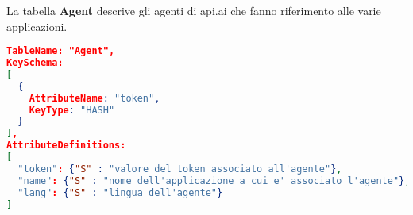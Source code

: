 La tabella \textbf{Agent} descrive gli agenti di api.ai che fanno riferimento alle varie applicazioni.
\begin{lstlisting}[language=json,firstnumber=1]
TableName: "Agent",
KeySchema:
[
  {
    AttributeName: "token",
    KeyType: "HASH"
  }
],
AttributeDefinitions:
[
  "token": {"S" : "valore del token associato all'agente"},
  "name": {"S" : "nome dell'applicazione a cui e' associato l'agente"},
  "lang": {"S" : "lingua dell'agente"}
]
\end{lstlisting}
